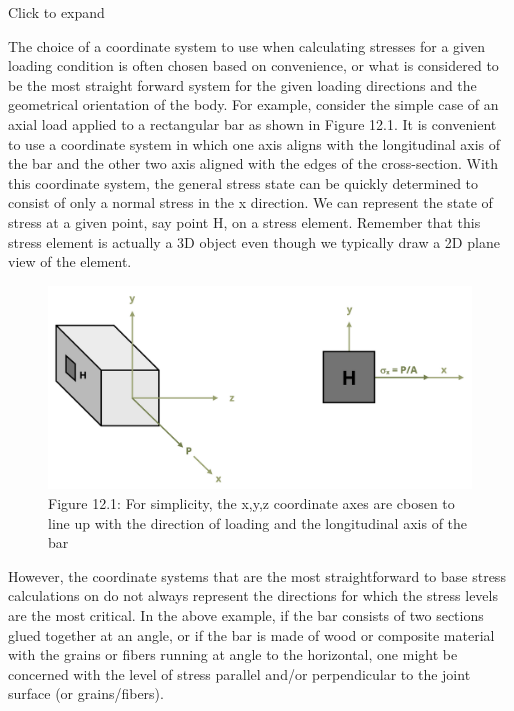 \documentclass[
  letterpaper,
  DIV=11,
  numbers=noendperiod]{scrreprt}
\theoremstyle{definition}
\theoremstyle{remark}
\begin{document}
Click to expand

The choice of a coordinate system to use when calculating stresses for a
given loading condition is often chosen based on convenience, or what is
considered to be the most straight forward system for the given loading
directions and the geometrical orientation of the body. For example,
consider the simple case of an axial load applied to a rectangular bar
as shown in Figure 12.1. It is convenient to use a coordinate system in
which one axis aligns with the longitudinal axis of the bar and the
other two axis aligned with the edges of the cross-section. With this
coordinate system, the general stress state can be quickly determined to
consist of only a normal stress in the x direction. We can represent the
state of stress at a given point, say point H, on a stress element.
Remember that this stress element is actually a 3D object even though we
typically draw a 2D plane view of the element.

\begin{figure}[H]

{\centering \includegraphics[width=5.82292in,height=\textheight]{images/CH12 figures/figure 12.1.png}

}

\caption{Figure 12.1: For simplicity, the x,y,z coordinate axes are
cbosen to line up with the direction of loading and the longitudinal
axis of the bar}

\end{figure}%

However, the coordinate systems that are the most straightforward to
base stress calculations on do not always represent the directions for
which the stress levels are the most critical. In the above example, if
the bar consists of two sections glued together at an angle, or if the
bar is made of wood or composite material with the grains or fibers
running at angle to the horizontal, one might be concerned with the
level of stress parallel and/or perpendicular to the joint surface (or
grains/fibers).
\end{document}
